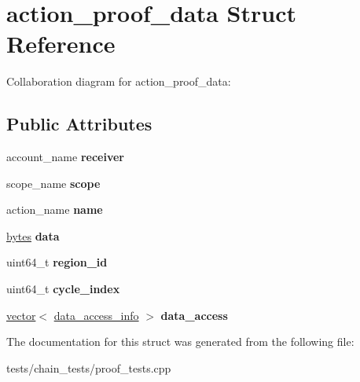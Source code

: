\hypertarget{structaction__proof__data}{}\section{action\+\_\+proof\+\_\+data Struct Reference}
\label{structaction__proof__data}


Collaboration diagram for action\+\_\+proof\+\_\+data\+:
\subsection*{Public Attributes}
\begin{DoxyCompactItemize}
\item 
\mbox{\label{structaction__proof__data_aec28b0e19ce89bcf95a72085bc530e26}} 
account\+\_\+name {\bfseries receiver}
\item 
\mbox{\label{structaction__proof__data_a1ad6404cdc7d89106cfce1057e66cf47}} 
scope\+\_\+name {\bfseries scope}
\item 
\mbox{\label{structaction__proof__data_aa9e663bfff89f61cee96d1e874b805ae}} 
action\+\_\+name {\bfseries name}
\item 
\mbox{\label{structaction__proof__data_ab206b44687e108b73c93055395c07bf6}} 
\mbox{\hyperlink{classstd_1_1vector}{bytes}} {\bfseries data}
\item 
\mbox{\label{structaction__proof__data_a9668b34b6b2f22f1bac1a5f4a6f75310}} 
uint64\+\_\+t {\bfseries region\+\_\+id}
\item 
\mbox{\label{structaction__proof__data_a4edee23fbb1fd877bdf2ad24974110a4}} 
uint64\+\_\+t {\bfseries cycle\+\_\+index}
\item 
\mbox{\label{structaction__proof__data_a4c2f9c2ba3e1aea23ab21556678c9dfa}} 
\mbox{\hyperlink{classstd_1_1vector}{vector}}$<$ \mbox{\hyperlink{structaacio_1_1chain_1_1data__access__info}{data\+\_\+access\+\_\+info}} $>$ {\bfseries data\+\_\+access}
\end{DoxyCompactItemize}


The documentation for this struct was generated from the following file\+:\begin{DoxyCompactItemize}
\item 
tests/chain\+\_\+tests/proof\+\_\+tests.\+cpp\end{DoxyCompactItemize}
